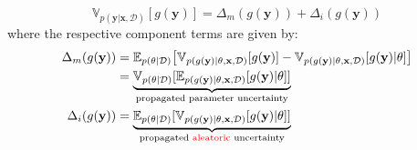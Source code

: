 \begin{equation}
\mathbb{V}_{p(\mathbf{y}|\mathbf{x},\mathcal{D})} [g(\mathbf{y})] = \Delta_{m}(g(\mathbf{y})) + \Delta_{i}(g(\mathbf{y}))  
\label{eq:variance_decomposition}
\end{equation}
where the respective component terms are given by:
\begin{align}
\Delta_{m}(g(\mathbf{y})) & = \mathbb{E}_{p(\theta|\mathcal{D})}\big{[}\mathbb{V}_{p(g(\mathbf{y})|\theta,\mathbf{x},\mathcal{D})}[g(\mathbf{y})]-\mathbb{V}_{p(g(\mathbf{y})|\theta,\mathbf{x},\mathcal{D})}[g(\mathbf{y})|\theta]\big{]} \\
&=\underbrace{\mathbb{V}_{p(\theta|\mathcal{D})}[\mathbb{E}_{p(g(\mathbf{y})|\theta,\mathbf{x},\mathcal{D})}[g(\mathbf{y})|\theta]]}_{\text{propagated parameter uncertainty}} 
\\
\Delta_{i}(g(\mathbf{y}))  &=   \underbrace{\mathbb{E}_{p(\theta|\mathcal{D})}[\mathbb{V}_{p(g(\mathbf{y})|\theta,\mathbf{x},\mathcal{D})}[g(\mathbf{y})|\theta]]}_{\text{propagated \textcolor{red}{aleatoric} uncertainty}} 
\end{align}

